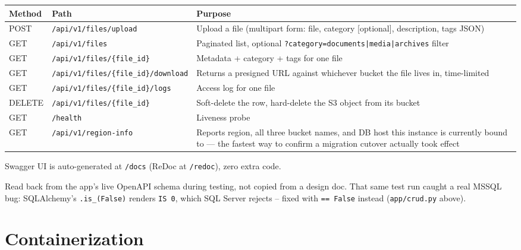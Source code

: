 \documentclass[10pt]{article}
\begin{document}
\noindent \begin{tabularx}{\textwidth}{@{}lp{4.3cm}X@{}}
\toprule
\rowcolor{tableHead} \textbf{Method} & \textbf{Path} & \textbf{Purpose} \\
\midrule
POST & \texttt{/api/\allowbreak v1/\allowbreak files/\allowbreak upload} & Upload a file (multipart form: file, category [optional], description, tags JSON) \\
\rowcolor{tableAlt} GET & \texttt{/api/\allowbreak v1/\allowbreak files} & Paginated list, optional \texttt{?category=documents|media|archives} filter \\
GET & \texttt{/api/\allowbreak v1/\allowbreak files/\allowbreak\{file\_id\}} & Metadata + category + tags for one file \\
\rowcolor{tableAlt} GET & \texttt{/api/\allowbreak v1/\allowbreak files/\allowbreak\{file\_id\}/\allowbreak download} & Returns a presigned URL against whichever bucket the file lives in, time-limited \\
GET & \texttt{/api/\allowbreak v1/\allowbreak files/\allowbreak\{file\_id\}/\allowbreak logs} & Access log for one file \\
\rowcolor{tableAlt} DELETE & \texttt{/api/\allowbreak v1/\allowbreak files/\allowbreak\{file\_id\}} & Soft-delete the row, hard-delete the S3 object from its bucket \\
GET & \texttt{/health} & Liveness probe \\
\rowcolor{tableAlt} GET & \texttt{/api/\allowbreak v1/\allowbreak region-info} & Reports region, all three bucket names, and DB host this instance is currently bound to --- the fastest way to confirm a migration cutover actually took effect \\
\bottomrule
\end{tabularx}

Swagger UI is auto-generated at \texttt{/docs} (ReDoc at \texttt{/redoc}),
zero extra code.

\begin{tipbox}
Read back from the app's live OpenAPI schema during testing, not copied
from a design doc. That same test run caught a real MSSQL bug:
SQLAlchemy's \texttt{.is\_(False)} renders \texttt{IS 0}, which SQL Server
rejects -- fixed with \texttt{== False} instead (\texttt{app/crud.py} above).
\end{tipbox}

\section{Containerization}
\label{sec:docker}
\end{document}
